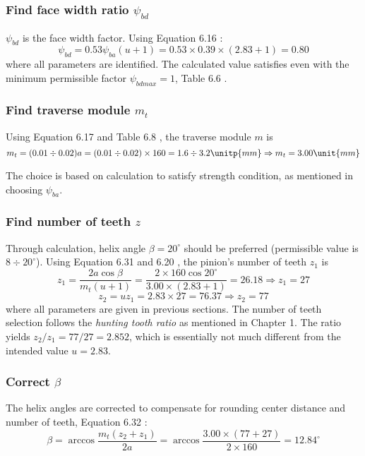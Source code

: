 \subsubsection{Find face width ratio $ \psi_{bd} $}
$ \psi_{bd} $ is the face width factor. Using Equation 6.16 \cite{tk1}:
\[ \psi_{bd} = 0.53\psi_{ba}(u+1) = 0.53\times 0.39\times(2.83+1) = 0.80 \]
where all parameters are identified. The calculated value satisfies even with the minimum permissible factor  $ \psi_{bdmax} = 1 $, Table 6.6 \cite{tk1}.
%
\subsubsection{Find traverse module $ m_t $}
Using Equation 6.17 and Table 6.8 \cite{tk1}, the traverse module $ m $ is
\[ m_t = (0.01\div0.02)a = (0.01\div0.02)\times 160 =  1.6 \div 3.2 \unitp{mm} \Rightarrow m_t=3.00\unit{mm}\]

The choice is based on calculation to satisfy strength condition, as mentioned in choosing $ \psi_{ba} $.
\subsubsection{Find number of teeth $ z $}
Through calculation, helix angle $ \beta = 20^\circ $ should be preferred (permissible value is $ 8 \div 20^\circ $). Using Equation 6.31 and 6.20 \cite{tk1}, the pinion's number of teeth $ z_1 $ is
\[ z_1 = \dfrac{2a\cos\beta}{m_t(u+1)}= \dfrac{2\times 160\cos 20^\circ}{3.00\times(2.83+1)} = 26.18 \Rightarrow z_1 = 27\]
\[ z_2 = uz_1 = 2.83\times 27 = 76.37 \Rightarrow z_2 = 77\]
where all parameters are given in previous sections. The number of teeth selection follows the \textit{hunting tooth ratio} \cite{Ishibashi1981} as mentioned in Chapter 1. The ratio yields $ z_2/z_1=77/27=2.852 $, which is essentially not much different from the intended value $ u =2.83$. 

\subsubsection{Correct $ \beta $} The helix angles are corrected to compensate for rounding center distance and number of teeth, Equation 6.32 \cite{tk1}:
\[\beta = \arccos\dfrac{m_t(z_2+z_1)}{2a} = \arccos\dfrac{3.00\times(77+27)}{2\times 160} = 12.84 ^\circ\]

